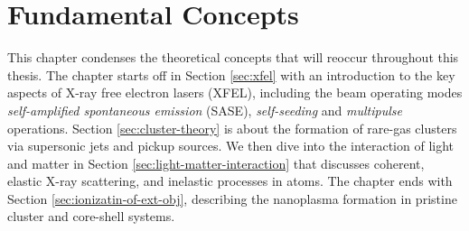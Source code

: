 \chapter{Fundamental Concepts}\label{ch:fundamental_concepts}
This chapter condenses the theoretical concepts that will reoccur throughout this thesis. The chapter starts off in Section \ref{sec:xfel} with an introduction to the key aspects of X-ray free electron lasers (XFEL), including the beam operating modes \textit{self-amplified spontaneous emission} (SASE), \textit{self-seeding} and \textit{multipulse} operations. Section \ref{sec:cluster-theory} is about the formation of rare-gas clusters via supersonic jets and pickup sources. We then dive into the interaction of light and matter in Section \ref{sec:light-matter-interaction} that discusses coherent, elastic X-ray scattering, and inelastic processes in atoms. The chapter ends with Section \ref{sec:ionizatin-of-ext-obj}, describing the nanoplasma formation in pristine cluster and core-shell systems.
%
%
%
